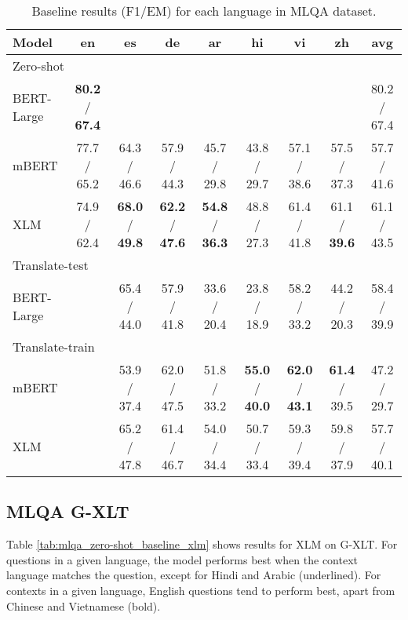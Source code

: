 \documentclass[11pt]{article}
\begin{document}
\begin{table*}[!ht]
    \centering
    \begin{adjustbox}{max width=\textwidth}
    \begin{tabular}{l|ccccccc|c}
    \toprule
        Model & en & es & de & ar & hi & vi & zh & avg \\ \midrule
        \multicolumn{9}{l}{Zero-shot} \\ \midrule
        BERT-Large & \textbf{80.2} / \textbf{67.4} & ~ & ~ & ~ & ~ & ~ & ~ & 80.2 / 67.4 \\ 
        mBERT & 77.7 / 65.2 & 64.3 / 46.6 & 57.9 / 44.3 & 45.7 / 29.8 & 43.8 / 29.7 & 57.1 / 38.6 & 57.5 / 37.3 & 57.7 / 41.6 \\ 
        XLM & 74.9 / 62.4 & \textbf{68.0} / \textbf{49.8} & \textbf{62.2} / \textbf{47.6} & \textbf{54.8} / \textbf{36.3} & 48.8 / 27.3 & 61.4 / 41.8 & 61.1 / \textbf{39.6} & 61.1 / 43.5 \\ \midrule
        \multicolumn{9}{l}{Translate-test} \\ \midrule
        BERT-Large & ~ & 65.4 / 44.0 & 57.9 / 41.8 & 33.6 / 20.4 & 23.8 / 18.9 & 58.2 / 33.2 & 44.2 / 20.3 & 58.4 / 39.9 \\ \midrule
        \multicolumn{9}{l}{Translate-train} \\ \midrule
        mBERT & ~ & 53.9 / 37.4 & 62.0 / 47.5 & 51.8 / 33.2 & \textbf{55.0} / \textbf{40.0} & \textbf{62.0} / \textbf{43.1} & \textbf{61.4} / 39.5 & 47.2 / 29.7\\
        XLM & ~ & 65.2 / 47.8 & 61.4 / 46.7 & 54.0 / 34.4 & 50.7 / 33.4 & 59.3 / 39.4 & 59.8 / 37.9 & 57.7 / 40.1 \\ 
        \bottomrule
    \end{tabular}
    \end{adjustbox}
    \caption{Baseline results (F1/EM) for each language in MLQA dataset.}
    \label{Baseline_results_MLQA}
\end{table*}

\subsection{MLQA G-XLT}

Table \ref{tab:mlqa_zero-shot_baseline_xlm} shows results for XLM on G-XLT. For questions in a given language, the model performs best when the context language matches the question, except for Hindi and Arabic (underlined). For contexts in a given language, English questions tend to
perform best, apart from Chinese and Vietnamese (bold).
\end{document}
